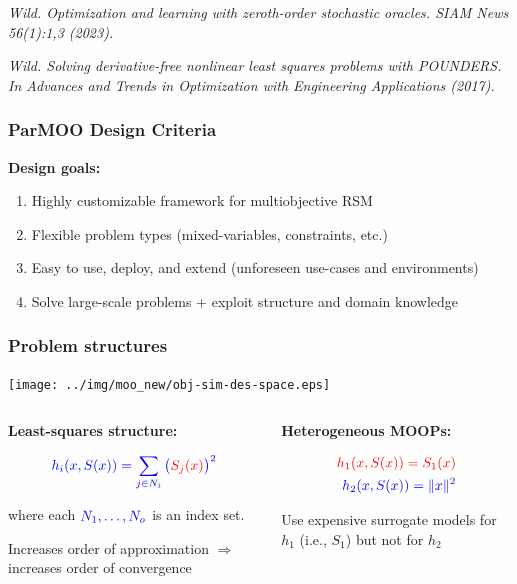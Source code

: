 \documentclass[aspectratio=169]{beamer}
\begin{document}
\begin{frame}
\medskip

{\tiny\it
Wild. Optimization and learning with zeroth-order stochastic oracles.
{\sl SIAM News 56(1):1,3 (2023).}\\
}

\medskip

{\tiny\it
Wild.
Solving derivative-free nonlinear least squares problems with POUNDERS.
{\sl In Advances and Trends in Optimization with Engineering Applications
(2017).}\\
}
\end{frame}

\begin{frame}\frametitle{ParMOO Design Criteria}

{\large
\textbf{Design goals:}}

\medskip

\begin{enumerate}
\item Highly customizable framework for multiobjective RSM
\item Flexible problem types (mixed-variables, constraints, etc.)
\item Easy to use, deploy, and extend (unforeseen use-cases and environments)
\item Solve large-scale problems + exploit structure and domain knowledge
\end{enumerate}
\end{frame}

\begin{frame}\frametitle{Problem structures}
\begin{center}
\texttt{[image: ../img/moo\_new/obj-sim-des-space.eps]}
\end{center}
\begin{columns}
\begin{column}{0.5\textwidth}
\textbf{Least-squares structure:}

\medskip

{\large
$$
{\color{blue} h_i(x, S(x)) = \sum_{j \in N_i} \big({\color{red}S_j(x)}\big)^2}
$$

where each ${\color{blue} N_1, \ldots, N_o}$ is an index set.
}

\bigskip

Increases order of approximation $\Rightarrow$
increases order of convergence

\end{column}
\begin{column}{0.5\textwidth}
\textbf{Heterogeneous MOOPs:}

{\large
\begin{align*}
{\color{red} h_1(x, S(x)) = S_1(x)}\\
{\color{blue} h_2(x, S(x)) = \|x \|^2}
\end{align*}
}

Use expensive surrogate models for {\color{red} $h_1$} (i.e.,
{\color{red} $S_1$}) but not for {\color{blue} $h_2$}

\end{column}
\end{columns}
\end{frame}
\end{document}
